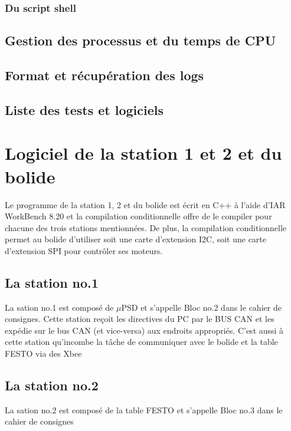 \documentclass[10pt,a4paper,final]{article}
\begin{document}
\begin{spacing}{1.5}
\subsubsection{Du script shell}

\subsection{Gestion des processus et du temps de CPU}

\subsection{Format et récupération des logs}

\subsection{Liste des tests et logiciels}






\pagebreak
\section{Logiciel de la station 1 et 2 et du bolide}
Le programme de la station 1, 2 et du bolide est écrit en C++ à l'aide d'IAR WorkBench 8.20 et la compilation conditionnelle offre de le compiler pour chacune des trois stations mentionnées. De plus, la compilation conditionnelle permet au bolide d'utiliser soit une carte d'extension I2C, soit une carte d'extension SPI pour contrôler ses moteurs.

\subsection{La station no.1}
La sation no.1 est composé de $\mu$PSD et s'appelle Bloc no.2 dans le cahier de consignes. Cette station reçoit les directives du PC par le BUS CAN et les expédie sur le bus CAN (et vice-versa) aux endroits appropriés. C'est aussi à cette station qu'incombe la tâche de communiquer avec le bolide et la table FESTO via des Xbee

\subsection{La station no.2}
La sation no.2 est composé de la table FESTO et s'appelle Bloc no.3 dans le cahier de consignes


\end{spacing}
\end{document}
